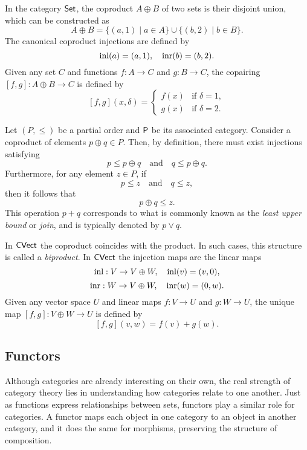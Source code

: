 \begin{example}
  In the category $\mathsf{Set}$, the coproduct \( A \oplus B \) of two sets is their disjoint union, which can be constructed as
\[
A \oplus B = \{(a, 1) \mid a \in A\} \cup \{(b, 2) \mid b \in B\}.
\]
The canonical coproduct injections are defined by
\[
\mathrm{inl}(a) = (a, 1), \quad \mathrm{inr}(b) = (b, 2).
\]
Given any set \(C\) and functions \(f: A \to C\) and \(g: B \to C\), the copairing \([f, g]: A \oplus B \to C\) is defined by
\[
[f, g](x, \delta) = 
\begin{cases}
f(x) & \text{if } \delta = 1, \\
g(x) & \text{if } \delta = 2.
\end{cases}
\]
\end{example}

\begin{example}
  Let $(P, \leq)$ be a partial order and $\mathsf{P}$ be its associated category.  
Consider a coproduct of elements \( p \oplus q \in P \). Then, by definition, there must exist injections satisfying
\[
p \leq p \oplus q \quad \text{and} \quad q \leq p \oplus q.
\]
Furthermore, for any element \( z \in P \), if
\[
p \leq z \quad \text{and} \quad q \leq z,
\]
then it follows that
\[
p \oplus q \leq z.
\]
This operation \( p + q \) corresponds to what is commonly known as the \emph{least upper bound} or \emph{join}, and is typically denoted by \( p \vee q \).
\end{example}


\begin{example}
  In $\mathsf{CVect}$ the coproduct coincides with the product. In such cases, this structure is called a \emph{biproduct}. 
  In  $\mathsf{CVect}$ the injection maps are the linear maps
\[
\mathrm{inl}: V \to  V \oplus W, \quad  \mathrm{inl}(v)= (v,0),
\]
\[
\mathrm{inr} : W \to V \oplus W, \quad \mathrm{inr}(w) = (0,w).
\]
Given any vector space $U$ and linear maps $f: V \to U$ and $g: W \to U$, the unique map $[ f, g] : V \oplus W \to U$
is defined by
\[
[f, g] (v,w) = f(v)+ g(w).
\]
\end{example}



\subsection{Functors}
  

Although categories are already interesting on their own, the real strength of category theory lies in understanding how categories relate to one another. Just as functions express relationships between sets, functors play a similar role for categories. A functor maps each object in one category to an object in another category, and it does the same for morphisms, preserving the structure of composition.

